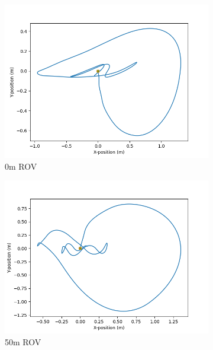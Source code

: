 \documentclass[class=article, crop=false]{standalone}
\begin{document}
\begin{figure}
    \centering
    \begin{subfigure}{0.7\textwidth}
        \centering
        \includegraphics{scenario1/rov-0m/0.0m/usv_position_controlled}
        \caption{0m ROV}
    \end{subfigure}
    \vfill
    \begin{subfigure}{0.7\textwidth}
        \centering
        \includegraphics{scenario1/rov-50m/0.0m/usv_position_controlled}
        \caption{50m ROV}
    \end{subfigure}
    \vfill
    \begin{subfigure}{0.7\textwidth}
        \centering

\end{subfigure}
\end{figure}
\end{document}
